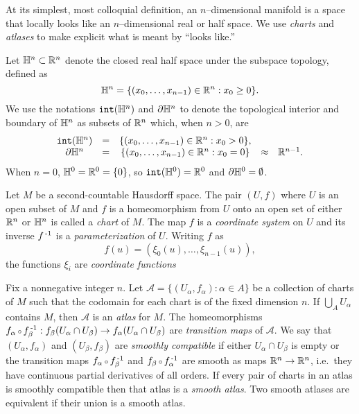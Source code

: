 At its simplest, most colloquial definition, an $n$--dimensional manifold is a space that locally looks like an $n$--dimensional real or half space.
We use \emph{charts} and \emph{atlases} to make explicit what is meant by ``looks like.''

\begin{defn}[Coordinates]
	\label{def:coordinates}
	Let $\mathbb{H}^n\subset\mathbb{R}^n$ denote the closed real half space under the subspace topology, defined as
	\[
		\mathbb{H}^n=\{(x_0,\dots,x_{n-1})\in\mathbb{R}^n : x_0\geq 0\}.
	\]
	We use the notations $\mathtt{int}(\mathbb{H}^n)$ and $\partial \mathbb{H}^n$ to denote the topological interior and boundary of $\mathbb{H}^n$ as subsets of $\mathbb{R}^n$ which, when $n>0$, are
	\[
		\begin{array}{ccccc}
			\mathtt{int}(\mathbb{H}^n) & = & \{(x_0,\dots,x_{n-1})\in\mathbb{R}^n : x_0 > 0\}, & &\\
			\partial \mathbb{H}^n	& = & \{(x_0,\dots,x_{n-1})\in\mathbb{R}^n : x_0 = 0\} & \approx & \mathbb{R}^{n-1}.
		\end{array}
	\]
	When $n=0$, $\mathbb{H}^0 = \mathbb{R}^0 = \{0\}$, so $\mathtt{int}(\mathbb{H}^0)=\mathbb{R}^0$ and $\partial\mathbb{H}^0=\emptyset$.

	Let $M$ be a second-countable Hausdorff space.
	The pair $(U,f)$ where $U$ is an open subset of $M$ and $f$ is a homeomorphism from $U$ onto an open set of either $\mathbb{R}^n$ or $\mathbb{H}^n$ is called a \emph{chart} of $M$.
	The map $f$ is a \emph{coordinate system} on $U$ and its inverse $f^{\,\text{-}1}$ is a \emph{parameterization} of $U$.
	Writing $f$ as
	\[
		f(u) = (\xi_0(u),\dots,\xi_{n-1}(u)),
	\]
	the functions $\xi_i$ are \emph{coordinate functions}
\end{defn}

\begin{defn}[Atlas]
	\label{def:atlas}
	Fix a nonnegative integer $n$.
	Let $\mathcal{A}=\{(U_\alpha,f_\alpha):\alpha\in A\}$ be a collection of charts of $M$ such that the codomain for each chart is of the fixed dimension $n$.
	If $\bigcup_A U_\alpha$ contains $M$, then $\mathcal{A}$ is an \emph{atlas} for $M$.
	The homeomorphisms $f_\alpha\comp f_\beta\inv:f_\beta(U_\alpha\cap U_\beta)\to f_\alpha(U_\alpha\cap U_\beta)$ are \emph{transition maps} of $\mathcal{A}$.
	We say that $(U_\alpha,f_\alpha)$ and $(U_\beta,f_\beta)$ are \emph{smoothly compatible} if either $U_\alpha\cap U_\beta$ is empty or the transition maps $f_\alpha\comp f_\beta\inv$ and $f_\beta\comp f_\alpha\inv$ are smooth as maps $\mathbb{R}^n\to\mathbb{R}^n$, i.e.\ they have continuous partial derivatives of all orders.
	If every pair of charts in an atlas is smoothly compatible then that atlas is a \emph{smooth atlas}.
	Two smooth atlases are equivalent if their union is a smooth atlas.
\end{defn}

